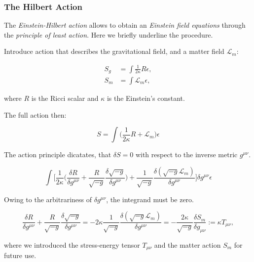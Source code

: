 {    %
    \subsubsection{The Hilbert Action}
    
    The \textit{Einstein-Hilbert action} allows to obtain an \textit{Einstein field equations} through the \textit{principle of least action}. Here we briefly underline the procedure.
    
    Introduce action that describes the gravitational field, and a matter field $\mathcal{L}_m$:
    
    \begin{align}
    S_g &= \int\frac{1}{2\kappa}R\epsilon, \\
    S_m &= \int\mathcal{L}_{m}\epsilon,
    \end{align}
    
    where $R$ is the Ricci scalar and $\kappa$ is the  Einstein's constant.
    
    The full action then:
    
    \begin{equation}
    S = \int\Big(\frac{1}{2\kappa}R+\mathcal{L}_m\Big)\epsilon
    \end{equation}
    
    The action principle dicatates, that $\delta S = 0$  with respect to the inverse metric $g^{\mu\nu}$. 
    
    \begin{equation}
    \int\Bigg[\frac{1}{2\kappa}\Big(\frac{\delta R}{\delta g^{\mu\nu}}+\frac{R}{\sqrt{-g}}\frac{\delta\sqrt{-g}}{\delta g^{\mu\nu}}\Big) + \frac{1}{\sqrt{-g}}\frac{\delta(\sqrt{-g}\mathcal{L}_m)}{\delta g^{\mu\nu}}\Bigg]\delta g^{\mu\nu}\epsilon
    \end{equation}
    
    Owing to the arbitrariness of $\delta g^{\mu\nu}$, the integrand must be zero. 
    
    \begin{equation}
    \frac{\delta R}{\delta g^{\mu\nu}} + \frac{R}{\sqrt{-g}}\frac{\delta\sqrt{-g}}{\delta g^{\mu\nu}} = -2\kappa\frac{1}{\sqrt{-g}}\frac{\delta(\sqrt{-g}\mathcal{L}_m)}{\delta g^{\mu\nu}} = -\frac{2\kappa}{\sqrt{-g}}\frac{\delta S_m}{\delta g_{\mu\nu}} := \kappa T_{\mu\nu},
    \label{eq:theory:action1}
    \end{equation}
    
    where we introduced the stress-energy tensor $T_{\mu\nu}$ and the matter action $S_m$ for future use. \\
    
}
